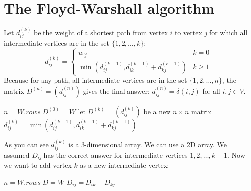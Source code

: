 \documentclass{book}
\begin{document}
	\section{The Floyd-Warshall algorithm}
	Let $d_{ij}^{(k)}$ be the weight of a shortest path from vertex $i$ to vertex $j$ for which all intermediate vertices are in the set $\{1, 2, \dots, k\}$:
	\begin{equation*}
	d_{ij}^{(k)} = \begin{cases}
		w_{ij} & k = 0 \\
		\min(d_{ij}^{(k - 1)}, d_{ik}^{(k - 1)} + d_{kj}^{(k - 1)}) & k \ge 1
	\end{cases}
	\end{equation*}
	Because for any path, all intermediate vertices are in the set $\{1, 2, \dots, n\}$, the matrix $D^{(n)} = (d_{ij}^{(n)})$ gives the final answer: $d_{ij}^{(n)} = \delta(i, j)$ for all $i, j \in V$.
	
		\begin{algorithm*}[h!]
			\begin{algorithmic}[1]
					\State $n = W.rows$
					\State $D^{(0)} = W$
						\State let $D^{(k)} = (d_{ij}^{(k)})$ be a new $n \times n$ matrix
								\State $d_{ij}^{(k)} = \min(d_{ij}^{(k - 1)}, d_{ik}^{(k - 1)} + d_{kj}^{(k - 1)})$
							\EndFor
						\EndFor
					\EndFor
				\EndFunction
			\end{algorithmic}
		\end{algorithm*}
		\FloatBarrier
	As you can see $d_{ij}^{(k)}$ is a 3-dimensional array. We can use a 2D array. We assumed $D_{ij}$ has the correct answer for intermediate vertices $1, 2, \dots, k - 1$. Now we want to add vertex $k$ as a new intermediate vertex:

		\begin{algorithm*}[h!]
			\begin{algorithmic}[1]
					\State $n = W.rows$
					\State $D = W$
									\State $D_{ij} = D_{ik} + D_{kj}$
								\EndIf
							\EndFor
						\EndFor
					\EndFor
				\EndFunction
			\end{algorithmic}
		\end{algorithm*}
		\FloatBarrier	
	
\end{document}
